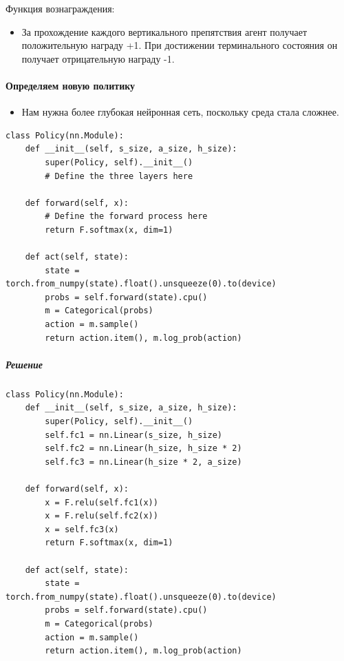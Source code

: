 \documentclass[11pt,a4paper]{article}
\begin{document}
Функция вознаграждения:

\begin{itemize}
\tightlist
\item
  За прохождение каждого вертикального препятствия агент получает положительную награду +1. При достижении терминального состояния он получает отрицательную награду -1.
\end{itemize}

\paragraph{Определяем новую политику}\label{define-the-new-policy}

\begin{itemize}
\tightlist
\item
  Нам нужна более глубокая нейронная сеть, поскольку среда стала сложнее.
\end{itemize}

\begin{lstlisting}
class Policy(nn.Module):
    def __init__(self, s_size, a_size, h_size):
        super(Policy, self).__init__()
        # Define the three layers here

    def forward(self, x):
        # Define the forward process here
        return F.softmax(x, dim=1)

    def act(self, state):
        state = torch.from_numpy(state).float().unsqueeze(0).to(device)
        probs = self.forward(state).cpu()
        m = Categorical(probs)
        action = m.sample()
        return action.item(), m.log_prob(action)
\end{lstlisting}

\subparagraph{Решение}\label{solution-2}

\begin{lstlisting}
class Policy(nn.Module):
    def __init__(self, s_size, a_size, h_size):
        super(Policy, self).__init__()
        self.fc1 = nn.Linear(s_size, h_size)
        self.fc2 = nn.Linear(h_size, h_size * 2)
        self.fc3 = nn.Linear(h_size * 2, a_size)

    def forward(self, x):
        x = F.relu(self.fc1(x))
        x = F.relu(self.fc2(x))
        x = self.fc3(x)
        return F.softmax(x, dim=1)

    def act(self, state):
        state = torch.from_numpy(state).float().unsqueeze(0).to(device)
        probs = self.forward(state).cpu()
        m = Categorical(probs)
        action = m.sample()
        return action.item(), m.log_prob(action)
\end{lstlisting}
\end{document}
